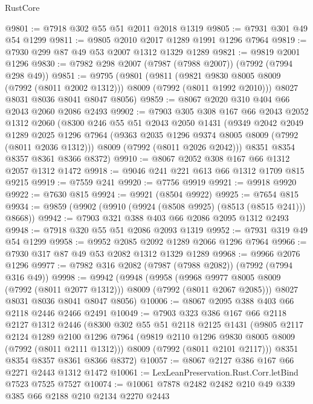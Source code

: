 \begin{lexlean}{RustCore}
\begin{coremodule}
@9801 := @7918 @302 @55 @51 @2011 @2018 @1319
@9805 := @7931 @301 @49 @54 @1299
@9811 := @9805 @2010 @2017 @1289 @1991 @1296 @7964
@9819 := @7930 @299 @87 @49 @53 @2007 @1312 @1329 @1289
@9821 := @9819 @2001 @1296
@9830 := @7982 @298 @2007 (@7987 (@7988 @2007)) (@7992 (@7994 @298 @49))
@9851 := @9795
    (@9801
      (@9811
        (@9821 @9830 @8005 @8009 (@7992 (@8011 @2002 @1312)))
        @8009
        (@7992 (@8011 @1992 @2010)))
      @8027
      @8031
      @8036
      @8041
      @8047
      @8056)
@9859 := @8067 @2020 @310 @404 @66 @2043 @2060 @2086 @2493
@9902 := @7903
    @305
    @308
    @167
    @66
    @2043
    @2052
    @1312
    @2060
    (@8300
      @246
      @55
      @51
      @2043
      @2050
      @1431
      (@9349
        @2042
        @2049
        @1289
        @2025
        @1296
        @7964
        (@9363 @2035 @1296 @9374 @8005 @8009 (@7992 (@8011 @2036 @1312)))
        @8009
        (@7992 (@8011 @2026 @2042)))
      @8351
      @8354
      @8357
      @8361
      @8366
      @8372)
@9910 := @8067 @2052 @308 @167 @66 @1312 @2057 @1312 @1472
@9918 := @9046 @241 @221 @613 @66 @1312 @1709 @815 @9215
@9919 := @7559 @241
@9920 := @7756 @9919
@9921 := @9918 @9920
@9922 := @7630 @815
@9924 := @9921 (@8504 @9922)
@9925 := @7654 @815
@9934 := @9859 (@9902 (@9910 (@9924 (@8508 @9925) (@8513 (@8515 @241))) @8668))
@9942 := @7903 @321 @388 @403 @66 @2086 @2095 @1312 @2493
@9948 := @7918 @320 @55 @51 @2086 @2093 @1319
@9952 := @7931 @319 @49 @54 @1299
@9958 := @9952 @2085 @2092 @1289 @2066 @1296 @7964
@9966 := @7930 @317 @87 @49 @53 @2082 @1312 @1329 @1289
@9968 := @9966 @2076 @1296
@9977 := @7982 @316 @2082 (@7987 (@7988 @2082)) (@7992 (@7994 @316 @49))
@9998 := @9942
    (@9948
      (@9958
        (@9968 @9977 @8005 @8009 (@7992 (@8011 @2077 @1312)))
        @8009
        (@7992 (@8011 @2067 @2085)))
      @8027
      @8031
      @8036
      @8041
      @8047
      @8056)
@10006 := @8067 @2095 @388 @403 @66 @2118 @2446 @2466 @2491
@10049 := @7903
    @323
    @386
    @167
    @66
    @2118
    @2127
    @1312
    @2446
    (@8300
      @302
      @55
      @51
      @2118
      @2125
      @1431
      (@9805
        @2117
        @2124
        @1289
        @2100
        @1296
        @7964
        (@9819 @2110 @1296 @9830 @8005 @8009 (@7992 (@8011 @2111 @1312)))
        @8009
        (@7992 (@8011 @2101 @2117)))
      @8351
      @8354
      @8357
      @8361
      @8366
      @8372)
@10057 := @8067 @2127 @386 @167 @66 @2271 @2443 @1312 @1472
@10061 := LexLeanPreservation.Rust.Corr.letBind @7523 @7525 @7527
@10074 := @10061 @7878 @2482 @2482 @210 @49 @339 @385 @66 @2188 @210 @2134 @2270 @2443

\end{coremodule}
\end{lexlean}
